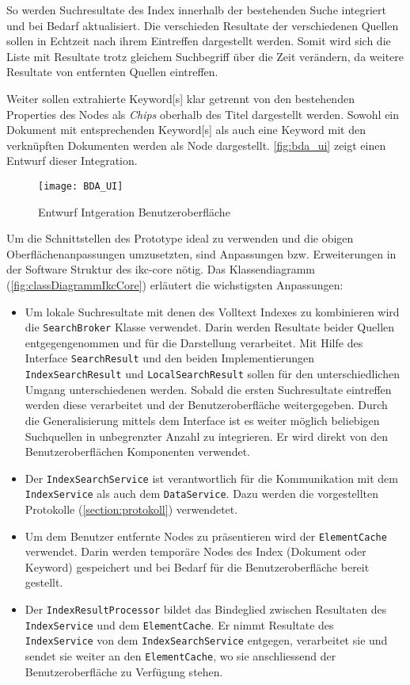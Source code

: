 So werden Suchresultate des Index innerhalb der bestehenden Suche integriert und bei Bedarf aktualisiert. Die verschieden Resultate der verschiedenen Quellen sollen in Echtzeit nach ihrem Eintreffen dargestellt werden. Somit wird sich die Liste mit Resultate trotz gleichem Suchbegriff über die Zeit verändern, da weitere Resultate von entfernten Quellen eintreffen. 

Weiter sollen extrahierte \gls{Keyword}[s] klar getrennt von den bestehenden Properties des Nodes als \textit{Chips} oberhalb des Titel dargestellt werden. Sowohl ein Dokument mit entsprechenden \gls{Keyword}[s] als auch eine \gls{Keyword} mit den verknüpften Dokumenten werden als Node dargestellt. \autoref{fig:bda_ui} zeigt einen Entwurf dieser Integration. 

    \begin{figure}[H]
    \centering
    \texttt{[image: BDA\_UI]}
    \caption{Entwurf Intgeration Benutzeroberfläche}
    \label{fig:bda_ui}
    \end{figure}

Um die Schnittstellen des Prototype ideal zu verwenden und die obigen Oberflächenanpassungen umzusetzten, sind Anpassungen bzw. Erweiterungen in der Software Struktur des \gls{ikc-core} nötig. Das Klassendiagramm (\autoref{fig:classDiagrammIkcCore}) erläutert die wichstigsten Anpassungen:

\begin{itemize}
    \item Um lokale Suchresultate mit denen des Volltext Indexes zu kombinieren wird die \texttt{SearchBroker} Klasse verwendet. Darin werden Resultate beider Quellen entgegengenommen und für die Darstellung verarbeitet. Mit Hilfe des Interface \texttt{SearchResult} und den beiden Implementierungen \texttt{IndexSearchResult} und \texttt{LocalSearchResult} sollen für den unterschiedlichen Umgang unterschiedenen werden. Sobald die ersten Suchresultate eintreffen werden diese verarbeitet und der Benutzeroberfläche weitergegeben. Durch die Generalisierung mittels dem Interface ist es weiter möglich beliebigen Suchquellen in unbegrenzter Anzahl zu integrieren. Er wird direkt von den Benutzeroberflächen Komponenten verwendet. 
    \item Der \texttt{IndexSearchService} ist verantwortlich für die Kommunikation mit dem \texttt{IndexService} als auch dem \texttt{DataService}. Dazu werden die vorgestellten Protokolle (\autoref{section:protokoll}) verwendetet.
    \item Um  dem Benutzer entfernte Nodes zu präsentieren wird der \texttt{ElementCache} verwendet. Darin werden temporäre Nodes des Index (Dokument oder \gls{Keyword}) gespeichert und bei Bedarf für die Benutzeroberfläche bereit gestellt.
    \item Der \texttt{IndexResultProcessor} bildet das Bindeglied zwischen Resultaten des \texttt{IndexService} und dem \texttt{ElementCache}. Er nimmt Resultate des \texttt{IndexService} von dem \texttt{IndexSearchService} entgegen, verarbeitet sie und sendet sie weiter an den \texttt{ElementCache}, wo sie anschliessend der Benutzeroberfläche zu Verfügung stehen.

\end{itemize}



